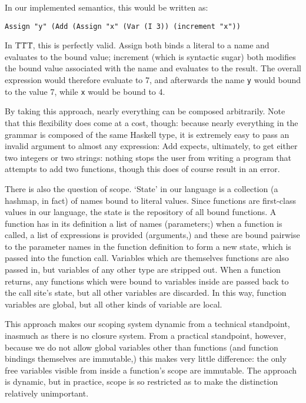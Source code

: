 \documentclass{article}
\begin{document}
In our implemented semantics, this would be written as:

\begin{lstlisting}
Assign "y" (Add (Assign "x" (Var (I 3)) (increment "x"))
\end{lstlisting}

In \"T\"T\"T, this is perfectly valid.  Assign both binds a literal to a name and evaluates to the bound value; increment (which is syntactic sugar) both modifies the bound value associated with the name and evaluates to the result.  The overall expression would therefore evaluate to 7, and afterwards the name \texttt{y} would bound to the value 7, while \texttt{x} would be bound to 4.

By taking this approach, nearly everything can be composed arbitrarily.  Note that this flexibility does come at a cost, though: because nearly everything in the grammar is composed of the same Haskell type, it is extremely easy to pass an invalid argument to almost any expression: Add expects, ultimately, to get either two integers or two strings: nothing stops the user from writing a program that attempts to add two functions, though this does of course result in an error.

There is also the question of scope.  `State' in our language is a collection (a hashmap, in fact) of names bound to literal values.  Since functions are first-class values in our language, the state is the repository of all bound functions.  A function has in its definition a list of names (parameters;) when a function is called, a list of expressions is provided (arguments,) and these are bound pairwise to the parameter names in the function definition to form a new state, which is passed into the function call.  Variables which are themselves functions are also passed in, but variables of any other type are stripped out.  When a function returns, any functions which were bound to variables inside are passed back to the call site's state, but all other variables are discarded.  In this way, function variables are global, but all other kinds of variable are local.

This approach makes our scoping system dynamic from a technical standpoint, inasmuch as there is no closure system.  From a practical standpoint, however, because we do not allow global variables other than functions (and function bindings themselves are immutable,) this makes very little difference: the only free variables visible from inside a function's scope are immutable.  The approach is dynamic, but in practice, scope is so restricted as to make the distinction relatively unimportant.
\end{document}

